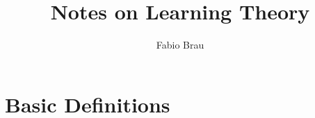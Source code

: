\documentclass[a4paper,11pt]{article}
\author{Fabio Brau}
\title{Notes on Learning Theory}
\theoremstyle{definition}
\begin{document}
\maketitle
\tableofcontents
\section{Basic Definitions}
\end{document}

